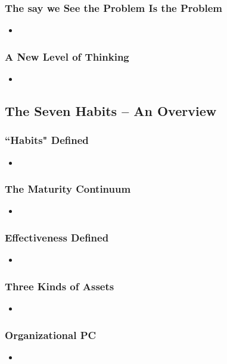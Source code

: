 \documentclass[11pt]{article}
\begin{document}
\subsubsection{The say we See the Problem Is the Problem}
\begin{itemize}
\item 
\end{itemize}
\subsubsection{A New Level of Thinking}
\begin{itemize}
\item 
\end{itemize}
\subsection{The Seven Habits -- An Overview}
\subsubsection{``Habits" Defined}
\begin{itemize}
\item 
\end{itemize}
\subsubsection{The Maturity Continuum}
\begin{itemize}
\item 
\end{itemize}
\subsubsection{Effectiveness Defined}
\begin{itemize}
\item 
\end{itemize}
\subsubsection{Three Kinds of Assets}
\begin{itemize}
\item 
\end{itemize}
\subsubsection{Organizational PC}
\begin{itemize}
\item 
\end{itemize}
\end{document}
